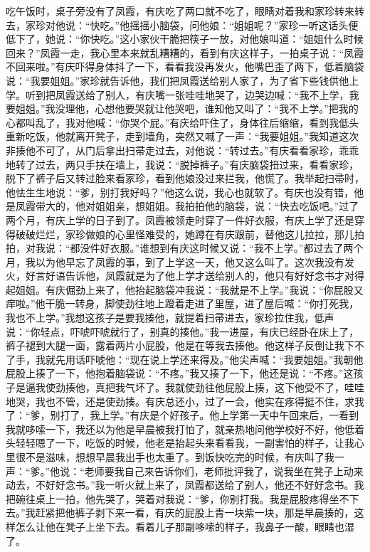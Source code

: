 \documentclass[12pt,UTF8]{ctexbook}
\begin{document}
吃午饭时，桌子旁没有了凤霞，有庆吃了两口就不吃了，眼睛对着我和家珍转来转去，家珍对他说：“快吃。”他摇摇小脑袋，问他娘：“姐姐呢？”家珍一听这话头便低下了，她说：“你快吃。”这小家伙干脆把筷子一放，对他娘叫道：“姐姐什么时候回来？”凤霞一走，我心里本来就乱糟糟的，看到有庆这样子，一拍桌子说：“凤霞不回来啦。”有庆吓得身体抖了一下，看看我没再发火，他嘴巴歪了两下，低着脑袋说：“我要姐姐。”家珍就告诉他，我们把凤霞送给别人家了，为了省下些钱供他上学。听到把凤霞送给了别人，有庆嘴一张哇哇地哭了，边哭边喊：“我不上学，我要姐姐。”我没理他，心想他要哭就让他哭吧，谁知他又叫了：“我不上学。”把我的心都叫乱了，我对他喊：“你哭个屁。”有庆给吓住了，身体往后缩缩，看到我低头重新吃饭，他就离开凳子，走到墙角，突然又喊了一声：“我要姐姐。”我知道这次非揍他不可了，从门后拿出扫帚走过去，对他说：“转过去。”有庆看看家珍，乖乖地转了过去，两只手扶在墙上，我说：“脱掉裤子。”有庆脑袋扭过来，看看家珍，脱下了裤子后又转过脸来看家珍，看到他娘没过来拦我，他慌了。我举起扫帚时，他怯生生地说：“爹，别打我好吗？”他这么说，我心也就软了。有庆也没有错，他是凤霞带大的，他对姐姐亲，想姐姐。我拍拍他的脑袋，说：“快去吃饭吧。”过了两个月，有庆上学的日子到了。凤霞被领走时穿了一件好衣服，有庆上学了还是穿得破破烂烂，家珍做娘的心里怪难受的，她蹲在有庆跟前，替他这儿拉拉，那儿拍拍，对我说：“都没件好衣服。”谁想到有庆这时候又说：“我不上学。”都过去了两个月，我以为他早忘了凤霞的事，到了上学这一天，他又这么叫了。这次我没有发火，好言好语告诉他，凤霞就是为了他上学才送给别人的，他只有好好念书才对得起姐姐。有庆倔劲上来了，他抬起脑袋冲我说：“我就是不上学。”我说：“你屁股又痒啦。”他干脆一转身，脚使劲往地上蹬着走进了里屋，进了屋后喊：“你打死我，我也不上学。”我想这孩子是要我揍他，就提着扫帚进去，家珍拉住我，低声说：“你轻点，吓唬吓唬就行了，别真的揍他。”我一进屋，有庆已经卧在床上了，裤子褪到大腿一面，露着两片小屁股，他是在等我去揍他。他这样子反倒让我下不了手，我就先用话吓唬他：“现在说上学还来得及。”他尖声喊：“我要姐姐。”我朝他屁股上揍了一下，他抱着脑袋说：“不疼。”我又揍了一下，他还是说：“不疼。”这孩子是逼我使劲揍他，真把我气坏了。我就使劲往他屁股上揍，这下他受不了，哇哇地哭，我也不管，还是使劲揍。有庆总还小，过了一会，他实在疼得挺不住，求我了：“爹，别打了，我上学。”有庆是个好孩子。他上学第一天中午回来后，一看到我就哆嗦一下，我还以为他是早晨被我打怕了，就亲热地问他学校好不好，他低着头轻轻嗯了一下，吃饭的时候，他老是抬起头来看看我，一副害怕的样子，让我心里很不是滋味，想想早晨我出手也太重了。到饭快吃完的时候，有庆叫了我一声：“爹。”他说：“老师要我自己来告诉你们，老师批评我了，说我坐在凳子上动来动去，不好好念书。”我一听火就上来了，凤霞都送给了别人，他还不好好念书。我把碗往桌上一拍，他先哭了，哭着对我说：“爹，你别打我。我是屁股疼得坐不下去。”我赶紧把他裤子剥下来一看，有庆的屁股上青一块紫一块，那是早晨揍的，这样怎么让他在凳子上坐下去。看着儿子那副哆嗦的样子，我鼻子一酸，眼睛也湿了。
\end{document}
